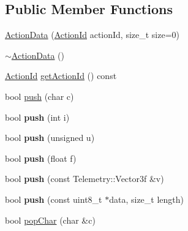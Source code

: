 \subsection*{Public Member Functions}
\begin{DoxyCompactItemize}
\item 
\mbox{\hyperlink{class_m210_1_1_action_data_ad6cfcb4e00155902b01e889c189fec0d}{Action\+Data}} (\mbox{\hyperlink{class_m210_1_1_action_data_a35cd47f396d015ad523e845ddfaeab4c}{Action\+Id}} action\+Id, size\+\_\+t size=0)
\item 
\mbox{\hyperlink{class_m210_1_1_action_data_a5ecfc6f8a7f284d5430e9a59bbe399b7}{$\sim$\+Action\+Data}} ()
\item 
\mbox{\hyperlink{class_m210_1_1_action_data_a35cd47f396d015ad523e845ddfaeab4c}{Action\+Id}} \mbox{\hyperlink{class_m210_1_1_action_data_a9fff91f297d917c9519f3b4d2d2e130b}{get\+Action\+Id}} () const
\item 
bool \mbox{\hyperlink{class_m210_1_1_action_data_afc4ee6af4070e59d6753b85e150c0b88}{push}} (char c)
\item 
\mbox{\label{class_m210_1_1_action_data_a805f85660b5dcde52f0008281980ae41}} 
bool {\bfseries push} (int i)
\item 
\mbox{\label{class_m210_1_1_action_data_ae70334b31e84f40475efaa9d5e7fd856}} 
bool {\bfseries push} (unsigned u)
\item 
\mbox{\label{class_m210_1_1_action_data_ab26b540b0d6d1397a6fdd5d0c765d834}} 
bool {\bfseries push} (float f)
\item 
\mbox{\label{class_m210_1_1_action_data_a452788de9a3df42f2c71add388c6a42f}} 
bool {\bfseries push} (const Telemetry\+::\+Vector3f \&v)
\item 
\mbox{\label{class_m210_1_1_action_data_a1be77c54720d9d22ffb9d4019575405f}} 
bool {\bfseries push} (const uint8\+\_\+t $\ast$data, size\+\_\+t length)
\item 
bool \mbox{\hyperlink{class_m210_1_1_action_data_a590c1f07f361ace0bdf6072abec3cf48}{pop\+Char}} (char \&c)
\item 
\mbox{\label{class_m210_1_1_action_data_a63d416b7fb36410d190d18a0203f715c}} 

\end{DoxyCompactItemize}
